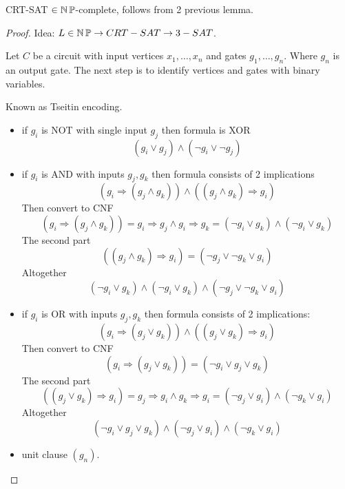 \begin{consequence}
	CRT-SAT $\in \operatorname{\operatorname{\mathbb{N}}\mathbb{P}}$-complete, follows from 2 previous lemma.
\end{consequence}

\begin{theorem}
\end{theorem}
\begin{proof}
	Idea: $L \in \operatorname{\operatorname{\mathbb{N}}\mathbb{P}} \to CRT-SAT \to 3-SAT$.

	Let $C$ be a circuit with input vertices $x_1, \ldots, x_n$ and gates $g_1, \ldots, g_n$.
	Where $g_n$ is an output gate.
	The next step is to identify vertices and gates with binary variables.

	Known as Tseitin encoding.
	\begin{itemize}
		\item if $g_i$ is NOT with single input $g_j$ then formula is XOR
			\[ (g_i \lor g_j) \land (\neg g_i \lor \neg g_j) \]

		\item if $g_i$ is AND with inputs $g_j, g_k$ then formula consists of 2 implications
			\[ (g_i \Rightarrow (g_j \land g_k)) \land ((g_j \land g_k) \Rightarrow g_i) \]
			Then convert to CNF
			\[ (g_i \Rightarrow (g_j \land g_k)) = g_i \Rightarrow g_j \land g_i \Rightarrow g_k = (\neg g_i \lor g_k) \land (\neg g_i \lor g_k ) \]
			The second part
			\[ ((g_j \land g_k) \Rightarrow g_i) = (\neg g_j \lor \neg g_k \lor g_i) \]
			Altogether
			\[ (\neg g_i \lor g_k) \land (\neg g_i \lor g_k ) \land (\neg g_j \lor \neg g_k \lor g_i) \]
		\item if $g_i$ is OR with inputs $g_j, g_k$ then formula consists of 2 implications:
			\[ (g_i \Rightarrow (g_j \lor g_k)) \land ((g_j \lor g_k) \Rightarrow g_i) \]
			Then convert to CNF
			\[ (g_i \Rightarrow (g_j \lor g_k)) = (\neg g_i \lor g_j \lor g_k)\]
			The second part
			\[ ((g_j \lor g_k) \Rightarrow g_i) = g_j \Rightarrow g_i \land g_k \Rightarrow g_i = (\neg g_j \lor g_i) \land (\neg g_k \lor g_i) \]
			Altogether
			\[ (\neg g_i \lor g_j \lor g_k) \land (\neg g_j \lor g_i) \land (\neg g_k \lor g_i) \]
		\item unit clause $(g_n)$.
	\end{itemize}
\end{proof}
